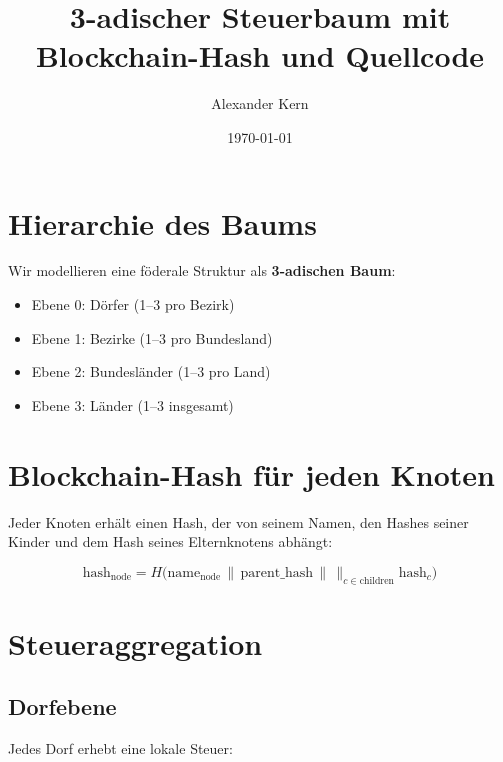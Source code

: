\documentclass[a4paper,12pt]{article}
\title{3-adischer Steuerbaum mit Blockchain-Hash und Quellcode}
\author{Alexander Kern}
\date{\today}
\begin{document}
\maketitle

\section{Hierarchie des Baums}
Wir modellieren eine föderale Struktur als \textbf{3-adischen Baum}:
\begin{itemize}
    \item Ebene 0: Dörfer (1--3 pro Bezirk)
    \item Ebene 1: Bezirke (1--3 pro Bundesland)
    \item Ebene 2: Bundesländer (1--3 pro Land)
    \item Ebene 3: Länder (1--3 insgesamt)
\end{itemize}

\begin{center}
\end{center}

\section{Blockchain-Hash für jeden Knoten}
Jeder Knoten erhält einen Hash, der von seinem Namen, den Hashes seiner Kinder und dem Hash seines Elternknotens abhängt:

\begin{equation}
\text{hash}_\text{node} = H\Big(\text{name}_\text{node} \,\|\, \text{parent\_hash} \,\|\, \big\|_{c \in \text{children}} \text{hash}_c \Big)
\end{equation}

\section{Steueraggregation}
\subsection{Dorfebene}
Jedes Dorf erhebt eine lokale Steuer:
\end{document}
